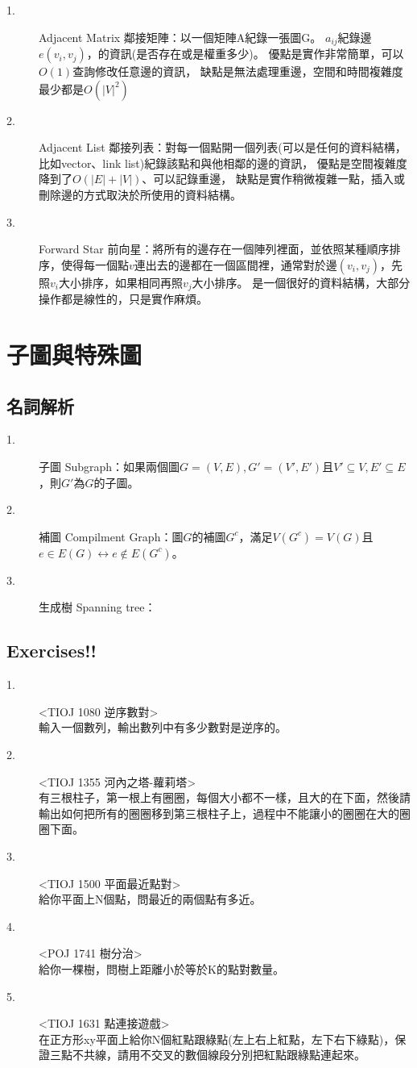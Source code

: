 \documentclass{article}
\begin{document}
\begin{description}
\item[ 1.]Adjacent Matrix 鄰接矩陣：以一個矩陣A紀錄一張圖G。
$a_{ij}$紀錄邊$e(v_i,v_j)$，的資訊(是否存在或是權重多少)。
優點是實作非常簡單，可以$O(1)$查詢修改任意邊的資訊，
缺點是無法處理重邊，空間和時間複雜度最少都是$O(|V|^2)$
\item[ 2.]Adjacent List 鄰接列表：對每一個點開一個列表(可以是任何的資料結構，比如vector、link list)紀錄該點和與他相鄰的邊的資訊，
優點是空間複雜度降到了$O(|E|+|V|)$、可以記錄重邊，
缺點是實作稍微複雜一點，插入或刪除邊的方式取決於所使用的資料結構。
\item[ 3.]Forward Star 前向星：將所有的邊存在一個陣列裡面，並依照某種順序排序，使得每一個點$v$連出去的邊都在一個區間裡，通常對於邊$(v_i,v_j)$，先照$v_i$大小排序，如果相同再照$v_j$大小排序。
是一個很好的資料結構，大部分操作都是線性的，只是實作麻煩。
\end{description}


\section{子圖與特殊圖}
\subsection{名詞解析}
\begin{description}
\item[ 1.]子圖 Subgraph：如果兩個圖$G = (V,E), G' = (V',E')$且$V' \subseteq V, E' \subseteq E$，則$G'$為$G$的子圖。
\item[ 2.]補圖 Compilment Graph：圖$G$的補圖$G^c$，滿足$V(G^c) = V(G)$且$e \in E(G) \leftrightarrow e \notin E(G^c)$。
\item[ 3.]生成樹 Spanning tree：
\end{description}


\subsection{Exercises!!}
\begin{description}
\item[ 1.]<TIOJ 1080 逆序數對>\\
輸入一個數列，輸出數列中有多少數對是逆序的。
\item[ 2.]<TIOJ 1355 河內之塔-蘿莉塔>\\
有三根柱子，第一根上有圈圈，每個大小都不一樣，且大的在下面，然後請輸出如何把所有的圈圈移到第三根柱子上，過程中不能讓小的圈圈在大的圈圈下面。
\item[ 3.]<TIOJ 1500 平面最近點對>\\
給你平面上N個點，問最近的兩個點有多近。
\item[ 4.]<POJ 1741 樹分治>\\
給你一棵樹，問樹上距離小於等於K的點對數量。
\item[ 5.]<TIOJ 1631 點連接遊戲>\\
在正方形xy平面上給你N個紅點跟綠點(左上右上紅點，左下右下綠點)，保證三點不共線，請用不交叉的數個線段分別把紅點跟綠點連起來。
\end{description}
\end{document}
